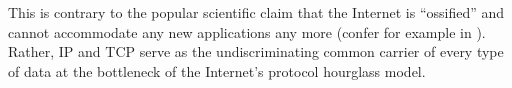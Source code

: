This is contrary to the popular scientific claim that the Internet is ``ossified'' and cannot accommodate any new applications any more (confer for example in \cite{turner2005diversifying}). Rather, \gls{IP} and \gls{TCP} serve as the undiscriminating common carrier of every type of data at the bottleneck of the Internet's protocol hourglass model.





















